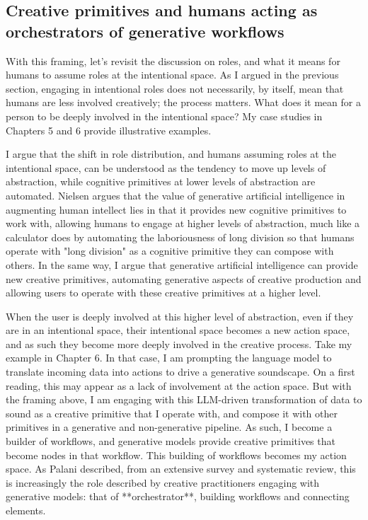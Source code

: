 \subsection{Creative primitives and humans acting as orchestrators of generative workflows}

With this framing, let's revisit the discussion on roles, and what it means for humans to assume roles at the intentional space. As I argued in the previous section, engaging in intentional roles does not necessarily, by itself, mean that humans are less involved creatively; the process matters. What does it mean for a person to be deeply involved in the intentional space? My case studies in Chapters 5 and 6 provide illustrative examples.

I argue that the shift in role distribution, and humans assuming roles at the intentional space, can be understood as the tendency to move up levels of abstraction, while cognitive primitives at lower levels of abstraction are automated. Nielsen argues that the value of generative artificial intelligence in augmenting human intellect lies in that it provides new cognitive primitives to work with, allowing humans to engage at higher levels of abstraction, much like a calculator does by automating the laboriousness of long division so that humans operate with "long division" as a cognitive primitive they can compose with others. In the same way, I argue that generative artificial intelligence can provide new creative primitives, automating generative aspects of creative production and allowing users to operate with these creative primitives at a higher level.

When the user is deeply involved at this higher level of abstraction, even if they are in an intentional space, their intentional space becomes a new action space, and as such they become more deeply involved in the creative process. Take my example in Chapter 6. In that case, I am prompting the language model to translate incoming data into actions to drive a generative soundscape. On a first reading, this may appear as a lack of involvement at the action space. But with the framing above, I am engaging with this LLM-driven transformation of data to sound as a creative primitive that I operate with, and compose it with other primitives in a generative and non-generative pipeline. As such, I become a builder of workflows, and generative models provide creative primitives that become nodes in that workflow. This building of workflows becomes my action space. As Palani described, from an extensive survey and systematic review, this is increasingly the role described by creative practitioners engaging with generative models: that of **orchestrator**, building workflows and connecting elements.

